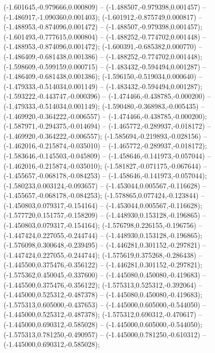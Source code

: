  (-1.601645,-0.979666,0.000809) -- (-1.488507,-0.979398,0.001457) -- (-1.486917,-1.090360,0.001403);
 (-1.601912,-0.875749,0.000817) -- (-1.488953,-0.874096,0.001472) -- (-1.488507,-0.979398,0.001457);
 (-1.601493,-0.777615,0.000804) -- (-1.488252,-0.774702,0.001448) -- (-1.488953,-0.874096,0.001472);
 (-1.600391,-0.685382,0.000770) -- (-1.486409,-0.681438,0.001386) -- (-1.488252,-0.774702,0.001448);
 (-1.598609,-0.599159,0.000715) -- (-1.483432,-0.594494,0.001287) -- (-1.486409,-0.681438,0.001386);
 (-1.596150,-0.519034,0.000640) -- (-1.479333,-0.514034,0.001149) -- (-1.483432,-0.594494,0.001287);
 (-1.593222,-0.443747,-0.000396) -- (-1.474466,-0.438785,-0.000200) -- (-1.479333,-0.514034,0.001149);
 (-1.590480,-0.368983,-0.005435) -- (-1.469920,-0.364222,-0.006557) -- (-1.474466,-0.438785,-0.000200);
 (-1.587971,-0.294375,-0.014694) -- (-1.465772,-0.289937,-0.018172) -- (-1.469920,-0.364222,-0.006557);
 (-1.585694,-0.219893,-0.028156) -- (-1.462016,-0.215874,-0.035010) -- (-1.465772,-0.289937,-0.018172);
 (-1.583646,-0.145503,-0.045809) -- (-1.458646,-0.141973,-0.057044) -- (-1.462016,-0.215874,-0.035010);
 (-1.581827,-0.071175,-0.067644) -- (-1.455657,-0.068178,-0.084253) -- (-1.458646,-0.141973,-0.057044);
 (-1.580233,0.003124,-0.093657) -- (-1.453044,0.005567,-0.116628) -- (-1.455657,-0.068178,-0.084253);
 (-1.578865,0.077424,-0.123844) -- (-1.450803,0.079317,-0.154164) -- (-1.453044,0.005567,-0.116628);
 (-1.577720,0.151757,-0.158209) -- (-1.448930,0.153128,-0.196865) -- (-1.450803,0.079317,-0.154164);
 (-1.576798,0.226155,-0.196756) -- (-1.447424,0.227055,-0.244744) -- (-1.448930,0.153128,-0.196865);
 (-1.576098,0.300648,-0.239495) -- (-1.446281,0.301152,-0.297821) -- (-1.447424,0.227055,-0.244744);
 (-1.575619,0.375268,-0.286438) -- (-1.445500,0.375476,-0.356122) -- (-1.446281,0.301152,-0.297821);
 (-1.575362,0.450045,-0.337600) -- (-1.445080,0.450080,-0.419683) -- (-1.445500,0.375476,-0.356122);
 (-1.575313,0.525312,-0.392064) -- (-1.445000,0.525312,-0.487378) -- (-1.445080,0.450080,-0.419683);
 (-1.575313,0.605000,-0.437653) -- (-1.445000,0.605000,-0.544050) -- (-1.445000,0.525312,-0.487378);
 (-1.575312,0.690312,-0.470617) -- (-1.445000,0.690312,-0.585028) -- (-1.445000,0.605000,-0.544050);
 (-1.575313,0.781250,-0.490957) -- (-1.445000,0.781250,-0.610312) -- (-1.445000,0.690312,-0.585028);
